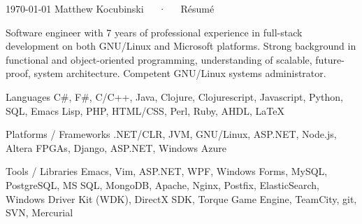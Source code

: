 \documentclass[11pt, letterpaper]{awesome-cv}
\begin{document}
\makecvheader

\makecvfooter
  {\today}
  {Matthew Kocubinski~~~·~~~Résumé}
  {\thepage}



\begin{cvparagraph}
\raggedright
Software engineer with 7 years of professional experience in full-stack development on both GNU/Linux
and Microsoft platforms.  Strong background in functional and object-oriented programming, understanding of 
scalable, future-proof, system architecture.  Competent GNU/Linux systems administrator. 
\end{cvparagraph}




\begin{cvskills}

  \cvskill
    {Languages} %
    {C\#, F\#, C/C++, Java, Clojure, Clojurescript, Javascript, Python, SQL, Emacs Lisp, PHP, HTML/CSS, Perl, Ruby, AHDL, LaTeX} %

  \cvskill
    {Platforms / Frameworks} %
    {.NET/CLR, JVM, GNU/Linux, ASP.NET, Node.js, Altera FPGAs, Django, ASP.NET, Windows Azure } %

  \cvskill
    {Tools / Libraries} %
    {Emacs, Vim, ASP.NET, WPF, Windows Forms, MySQL, PostgreSQL, MS SQL, MongoDB, Apache, Nginx, Postfix, ElasticSearch, Windows Driver Kit (WDK), DirectX SDK, Torque Game Engine, TeamCity, git, SVN, Mercurial}

\end{cvskills}
\end{document}
